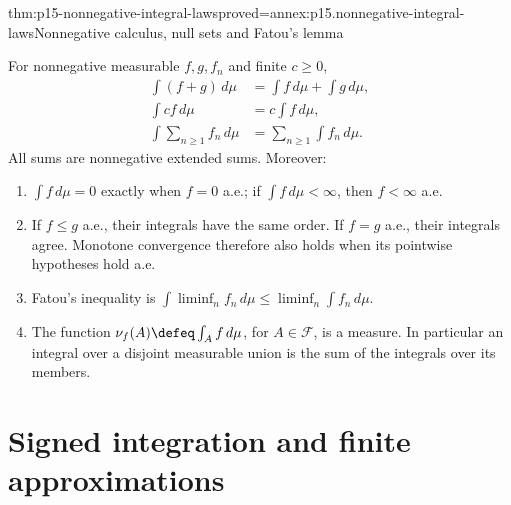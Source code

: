 \begin{hbtheorem}{thm:p15-nonnegative-integral-laws}{proved=annex:p15.nonnegative-integral-laws}{Nonnegative calculus, null sets and Fatou's lemma}
\par\nobreak
For nonnegative measurable \(f,g,f_n\) and finite \(c\geq0\),
\[
 \begin{aligned}
 \int(f+g)\,d\mu&=\int f\,d\mu+\int g\,d\mu,\\
 \int cf\,d\mu&=c\int f\,d\mu,\\
 \int\sum_{n\geq1}f_n\,d\mu&=\sum_{n\geq1}\int f_n\,d\mu.
 \end{aligned}
\]
All sums are nonnegative extended sums. Moreover:
\begin{enumerate}
\item \(\int f\,d\mu=0\) exactly when \(f=0\) a.e.; if
      \(\int f\,d\mu<\infty\), then \(f<\infty\) a.e.
\item If \(f\leq g\) a.e., their integrals have the same order.
      If \(f=g\) a.e., their integrals agree. Monotone convergence
      therefore also holds when its pointwise hypotheses hold a.e.
\item Fatou's inequality is
      \(\int\liminf_n f_n\,d\mu\leq\liminf_n\int f_n\,d\mu\).
\item The function \(\nu_f(A)\defeq\int_A f\,d\mu\), for
      \(A\in\mathcal F\), is a measure. In particular an integral
      over a disjoint measurable union is the sum of the integrals
      over its members.
\end{enumerate}
\end{hbtheorem}

\section{Signed integration and finite approximations}
\label{sec:p15-signed-integral}

